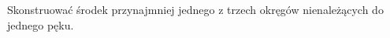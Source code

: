 \begin{geoconstruction}
    \label{delta_2024_12_end}
    Skonstruować środek przynajmniej jednego z trzech okręgów nienależących do jednego pęku.
\end{geoconstruction}
